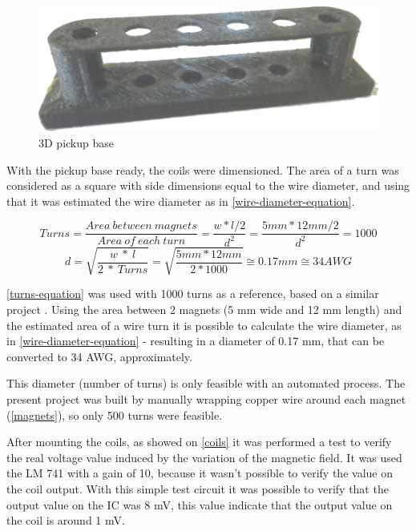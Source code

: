 \begin{figure}[!htpb]
\centering
\caption{3D pickup base}
\label{3D-base}
\includegraphics[scale=0.2]{images/base}
\end{figure}

With the pickup base ready, the coils were dimensioned. The area of a turn
was considered as a square with side dimensions equal to the wire diameter, and using that
it was estimated the wire diameter as in \autoref{wire-diameter-equation}.

\begin{equation}
  \label{turns-equation}
  Turns = \frac{Area\ between\ magnets}{Area\ of\ each\ turn} = \frac{ w * l / 2 }{ d^{2} } = \frac{5 mm * 12 mm / 2}{d^2} = 1000
\end{equation}
\begin{equation}
  \label{wire-diameter-equation}
  d = \sqrt{\frac{w\ *\ l}{2\ *\ Turns}} = \sqrt{\frac{5 mm * 12 mm}{2*1000}} \cong 0.17 mm \cong 34 AWG
\end{equation}

\autoref{turns-equation} was used with 1000 turns as a reference, based on a similar project
\cite{hexaphonic-pickup}. Using the area between 2 magnets (5 mm wide
and 12 mm length) and the estimated area of a wire turn it is possible to calculate the wire diameter,
as in \autoref{wire-diameter-equation} - resulting in a diameter of 0.17 mm, that can be
converted to 34 AWG, approximately. 

This diameter (number of turns) is only feasible with an automated process. The present project was built by manually
wrapping copper wire around each magnet (\autoref{magnets}), so only 500 turns were feasible. 

After mounting the coils, as showed on \autoref{coils} it was performed a test to verify the real voltage value induced by
the variation of the magnetic field. It was used the LM 741 \cite{LM741} with a gain of 10,
because it wasn't possible to verify the value on the coil output. With this simple test circuit
it was possible to verify that the output value on the IC was 8 mV, this value indicate that the
output value on the coil is around 1 mV.

